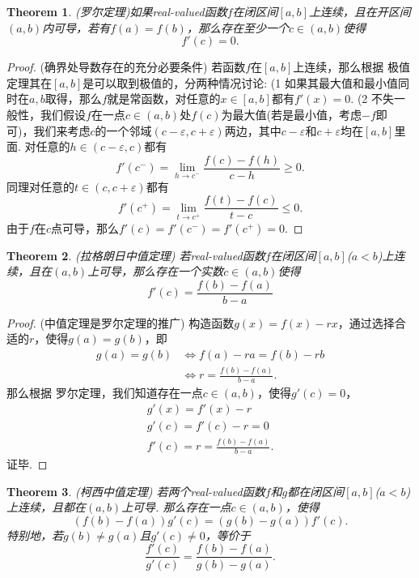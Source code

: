\documentclass{article}
\newtheorem{theorem}{Theorem}[section]
\begin{document}
\begin{theorem}
\rm {\color{red} (罗尔定理)}如果real-valued函数$f$在闭区间$[a,b]$上连续，且在开区间$(a,b)$内可导，若有$f(a) = f(b)$，那么存在至少一个$c \in (a,b)$使得
$$
f'(c) = 0.
$$
\end{theorem}

\begin{proof}
{\color{blue} (确界处导数存在的充分必要条件)} 若函数$f$在$[a,b]$上连续，那么根据{\color{red} 极值定理}其在$[a,b]$是可以取到极值的，分两种情况讨论: (1 如果其最大值和最小值同时在$a,b$取得，那么$f$就是常函数，对任意的$x \in [a,b]$都有$f'(x) = 0$. (2 不失一般性，我们假设$f$在一点$c \in (a,b)$处$f(c)$为最大值(若是最小值，考虑$-f$即可)，我们来考虑$c$的一个邻域$(c-\varepsilon, c+\varepsilon)$两边，其中$c-\varepsilon$和$c+\varepsilon$均在$[a,b]$里面. 对任意的$h \in (c-\varepsilon, c)$都有
$$
f'(c^-) = \lim\limits_{h \rightarrow c^-}\frac{f(c)- f(h)}{c-h} \geq 0. 
$$
同理对任意的$t \in (c,c+\varepsilon)$都有
$$
f'(c^+) = \lim\limits_{t \rightarrow c^+}\frac{f(t)-f(c)}{t-c} \leq 0.
$$
由于$f$在$c$点可导，那么$f'(c) = f'(c^-) = f'(c^+) = 0$.
\end{proof}


\begin{theorem}
\rm {\color{red} (拉格朗日中值定理)} 若real-valued函数$f$在闭区间$[a,b]$($a < b$)上连续，且在$(a,b)$上可导，那么存在一个实数$c \in (a,b)$使得
$$
f'(c) = \frac{f(b) - f(a)}{b-a}
$$ 
\end{theorem}

\begin{proof}
{\color{blue} (中值定理是罗尔定理的推广)} 构造函数$g(x) = f(x) - rx$，通过选择合适的$r$，使得$g(a) = g(b)$，即
$$
\begin{array}{ll}
g(a) = g(b) &\Leftrightarrow f(a) - ra = f(b) - rb \\
			&\Leftrightarrow r = \frac{f(b) - f(a)}{b-a}.
\end{array} 
$$
那么根据{\color{red} 罗尔定理}，我们知道存在一点$c \in (a,b)$，使得$g'(c) = 0$，
$$
\begin{array}{ll}
g'(x) = f'(x) - r \\
g'(c) = f'(c) - r = 0 \\
f'(c) = r = \frac{f(b) - f(a)}{b-a}.
\end{array}  
$$
证毕.
\end{proof}


\begin{theorem}
\rm {\color{red} (柯西中值定理)} 若两个real-valued函数$f$和$g$都在闭区间$[a,b]$($a < b$)上连续，且都在$(a,b)$上可导. 那么存在一点$c \in (a,b)$，使得
$$
(f(b) - f(a))g'(c) = (g(b) - g(a))f'(c). 
$$
特别地，若$g(b) \neq g(a)$且$g'(c) \neq 0$，等价于
$$
\frac{f'(c)}{g'(c)} = \frac{f(b)-f(a)}{g(b) - g(a)}.
$$
\end{theorem}
\end{document}
